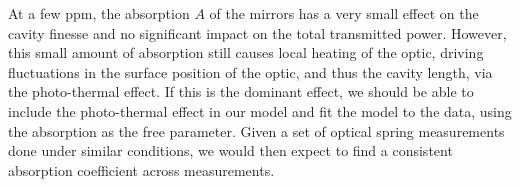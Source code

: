 At a few ppm, the absorption $A$ of the mirrors has a very small effect on the cavity finesse and no significant impact on the total transmitted power. However, this small amount of absorption still causes local heating of the optic, driving fluctuations in the surface position of the optic, and thus the cavity length, via the photo-thermal effect. If this is the dominant effect, we should be able to include the photo-thermal effect in our model and fit the model to the data, using the absorption as the free parameter. Given a set of optical spring measurements done under similar conditions, we would then expect to find a consistent absorption coefficient across measurements.

%
%
%
%

